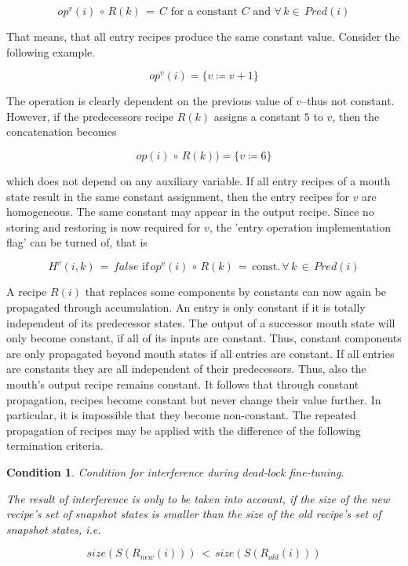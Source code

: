 \documentclass[12pt,a4paper]{scrartcl}
\newtheorem{condition}{Condition}
\begin{document}
\begin{equation} \label{eq:homogeneity-condition-2}
    op^v(i)\,\circ\,R(k)\,=\,C\,\,\mbox{for a constant $C$ and } \forall\,k\in\,Pred(i)
\end{equation}

That means, that all entry recipes produce the same constant value. Consider
the following example.

\begin{equation}
    op^v(i) = \{ v \coloneqq  v + 1 \}
\end{equation}

The operation is clearly dependent on the previous value of $v$--thus not
constant. However, if the predecessors recipe $R(k)$ assigns a constant $5$ to
$v$, then the concatenation becomes

\begin{equation}
    op(i)\,\circ\,R(k)) = \{ v \coloneqq  6 \}
\end{equation}

which does not depend on any auxiliary variable. If all entry recipes of a
mouth state result in the same constant assignment, then the entry recipes for
$v$ are homogeneous.  The same constant may appear in the output recipe. Since
no storing and restoring is now required for $v$, the 'entry operation
implementation flag' can be turned of, that is

\begin{equation}
    H^v(i,k)\,=\,false\,\,\mbox{if}\,op^v(i)\,\circ\,R(k)\,=\,\mbox{const.}\,\forall\,k\,\in\,Pred(i)
\end{equation}

A recipe $R(i)$ that replaces some components by constants can now again be
propagated through accumulation. An entry is only constant if it is totally
independent of its predecessor states. The output of a successor mouth state
will only become constant, if all of its inputs are constant. Thus, constant
components are only propagated beyond mouth states if all entries are constant.
If all entries are constants they are all independent of their predecessors.
Thus, also the mouth's output recipe remains constant. It follows that through
constant propagation, recipes become constant but never change their value
further.  In particular, it is impossible that they become non-constant.
The repeated propagation of recipes may be applied with the difference of the
following termination criteria.

\begin{condition}
Condition for interference during dead-lock fine-tuning.

The result of interference is only to be taken into account, if the size of the
new recipe's set of snapshot states is smaller than the size of the old
recipe's set of snapshot states, i.e.

\begin{equation} 
    size(S(R_{new}(i)))\,<\,size(S(R_{old}(i)))
\end{equation}

\end{condition}
\end{document}
